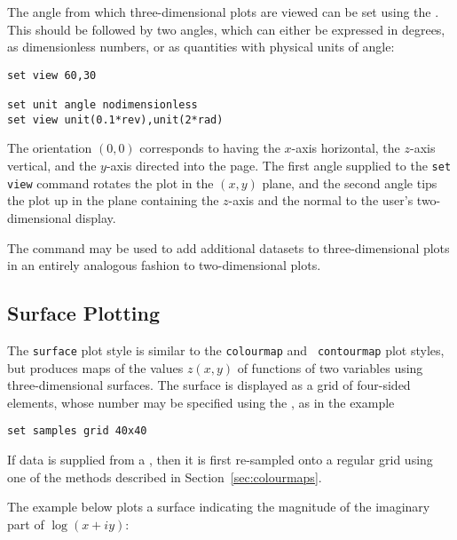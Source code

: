 The angle from which three-dimensional plots are viewed can be set using the
. This should be followed by two angles, which can either be
expressed in degrees, as dimensionless numbers, or as quantities with physical
units of angle:
\begin{verbatim}
set view 60,30

set unit angle nodimensionless
set view unit(0.1*rev),unit(2*rad)
\end{verbatim}
The orientation $(0,0)$ corresponds to having the $x$-axis horizontal, the
$z$-axis vertical, and the $y$-axis directed into the page. The first angle
supplied to the {\tt set view} command rotates the plot in the $(x,y)$ plane,
and the second angle tips the plot up in the plane containing the $z$-axis and
the normal to the user's two-dimensional display.

The  command may be used to add additional datasets to
three-dimensional plots in an entirely analogous fashion to two-dimensional
plots.

\subsection{Surface Plotting}
\label{sec:surfaces}

The {\tt surface} plot style is similar to the {\tt colourmap} and {\tt
contourmap} plot styles, but produces maps of the values $z(x,y)$ of functions
of two variables using three-dimensional surfaces. The surface is displayed as
a grid of four-sided elements, whose number may be specified using the
, as in the example
\begin{verbatim}
set samples grid 40x40
\end{verbatim}
If data is supplied from a \datafile, then it is first re-sampled onto a regular
grid using one of the methods described in Section~\ref{sec:colourmaps}.

The example below plots a surface indicating the magnitude of the imaginary
part of $\log(x+iy)$:

\vspace{2mm}
\newline
{}\newline
{}\newline
{}\newline
{}\newline
{}\newline
{}\newline
{}\newline
{}\newline
{}

